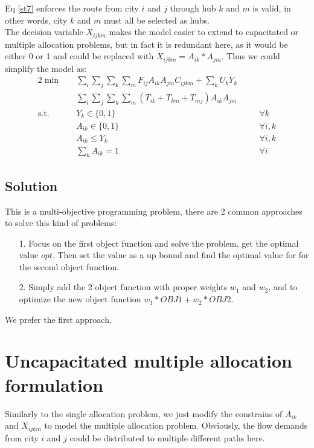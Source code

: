 \documentclass{llncs}
\begin{document}
	Eq \ref{st7} enforces the route from city $i$ and $j$ through hub $k$ and $m$ is valid, in other words, city $k$ and $m$ must all be selected as hubs. \\

The decision variable $X_{ijkm}$ makes the model easier to extend to capacitated or multiple allocation problems, but in fact it is redundant here, as it would be either 0 or 1 and could be replaced with $X_{ijkm} = A_{ik} * A_{jm}$. Thus we could simplify the model as:
	\begin{alignat}{2}
		\min\quad
		& \sum_{i}\sum_{j}\sum_{k}\sum_{m}F_{ij}  A_{ik} A_{jm} C_{ijkm} + \sum_{k}U_k Y_{k} & & \nonumber\\
		\quad& \sum_{i}\sum_{j}\sum_{k}\sum_{m}{(T_{ik}+ T_{km}+ T_{mj} ) A_{ik} A_{jm}}  & & \tag{LP2} \label{lp2}\\
		\mbox{s.t.}  \quad
		&Y_{k} \in \{0,1\} &\quad& \forall k \label{st1.1}\\ 
		&A_{ik} \in \{0,1\} &\quad& \forall i,k \label{st1.2}\\ 
		&A_{ik} \leq Y_{k} &\quad& \forall i,k \label{st1.3}\\
		&\sum_{k}{A_{ik}} = 1 &\quad& \forall i \label{st1.4}
	\end{alignat}


\subsection{Solution}

	This is a multi-objective programming problem, there are 2 common approaches to solve this kind of problems:
	\begin{itemize}
		\item[1.] Focus on the first object function and solve the problem, get the optimal value $opt$. Then set the value as a up bound and find the optimal value for for the second object function.
		\item[2.] Simply add the 2 object function with proper weights $w_1$ and $w_2$, and to optimize the new object function $w_1*OBJ1+w_2*OBJ2$.
	\end{itemize}
	
	We prefer the first approach.
	
\section{Uncapacitated multiple allocation formulation}
	Similarly to the single allocation problem, we just modify the constrains of $A_{ik}$ and $X_{ijkm}$ to model the multiple allocation problem. Obviously, the flow demands from city $i$ and $j$ could be distributed to multiple different paths here.
	
\end{document}
